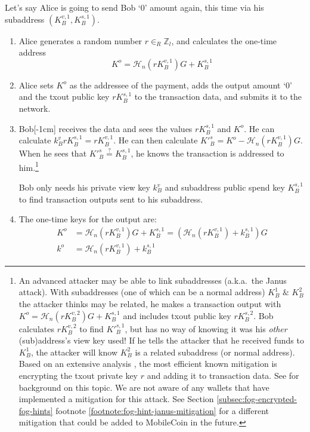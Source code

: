 Let's say Alice is going to send Bob `0' amount again, this time via his subaddress $(K_B^{v,1}, K_B^{s,1})$.
\begin{enumerate}
	\item Alice generates a random number $r \in_R \mathbb{Z}_l$, and calculates the one-time address\vspace{.175cm}
	\[ K^o  = \mathcal{H}_n(r K_B^{v,1})G + K_B^{s,1} \]

	\item Alice sets $K^o$ as the addressee of the payment, adds the output amount `0' and the txout public key $r K_B^{s,1}$ to the transaction data, and submits it to the network.

	\item Bob[-1cm] receives the data and sees the values $r K_B^{s,1}$ and $K^o$. He can calculate $k_B^v r K_B^{s,1} = r K_B^{v,1}$. He can then calculate $K'^{s}_B = K^o - \mathcal{H}_n(r K_B^{v,1})G$. When he sees that $K'^{s}_B \stackrel{?}{=} K^{s,1}_B$, he knows the transaction is addressed to him.\footnote{\label{footnote:janus-attack}An advanced attacker may be able to link subaddresses \cite{janus-attack} (a.k.a.\ the Janus attack). With subaddresses (one of which can be a normal address) $K_B^1$ $\&$ $K_B^2$ the attacker thinks may be related, he makes a transaction output with $K^o = \mathcal{H}_n(r K_B^{v,2})G + K_B^{s,1}$ and includes txout public key $r K_B^{s,2}$. Bob calculates $r K_B^{v,2}$ to find $K'^{s,1}_B$, but has no way of knowing it was his {\em other} (sub)address's view key used! If he tells the attacker that he received funds to $K_B^1$, the attacker will know $K_B^2$ is a related subaddress (or normal address). Based on an extensive analysis \cite{update-tx-supplement-proposal-monero}, the most efficient known mitigation is encrypting the txout private key $r$ and adding it to transaction data. See \cite{janus-mitigation-issue-62} for background on this topic. We are not aware of any wallets that have implemented a mitigation for this attack. See Section \ref{subsec:fog-encrypted-fog-hints} footnote \ref{footnote:fog-hint-janus-mitigation} for a different mitigation that could be added to MobileCoin in the future.}

	Bob only needs his private view key $k_B^v$ and subaddress public spend key $K^{s,1}_B$ to find transaction outputs sent to his subaddress.

	\item The one-time keys for the output are:\vspace{.175cm}
	\begin{align*}
		K^o &= \mathcal{H}_n(r K_B^{v,1})G + K_B^{s,1} = (\mathcal{H}_n(r K_B^{v,1}) + k_B^{s,1})G  \\ 
		k^o &= \mathcal{H}_n(r K_B^{v,1}) + k_B^{s,1}
	\end{align*}
\end{enumerate}



